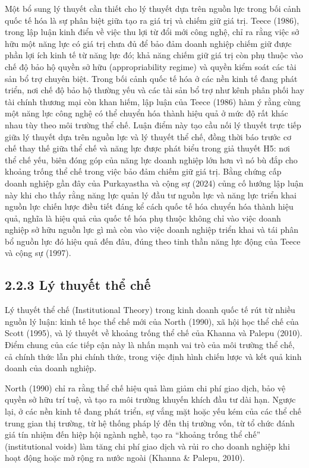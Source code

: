 \documentclass[
  a4paper,
  13pt]{extreport}
\begin{document}
Một bổ sung lý thuyết cần thiết cho lý thuyết dựa trên nguồn lực trong
bối cảnh quốc tế hóa là sự phân biệt giữa tạo ra giá trị và chiếm giữ
giá trị. Teece (1986), trong lập luận kinh điển về việc thu lợi từ đổi
mới công nghệ, chỉ ra rằng việc sở hữu một năng lực có giá trị chưa đủ
để bảo đảm doanh nghiệp chiếm giữ được phần lợi ích kinh tế từ năng lực
đó; khả năng chiếm giữ giá trị còn phụ thuộc vào chế độ bảo hộ quyền sở
hữu (appropriability regime) và quyền kiểm soát các tài sản bổ trợ
chuyên biệt. Trong bối cảnh quốc tế hóa ở các nền kinh tế đang phát
triển, nơi chế độ bảo hộ thường yếu và các tài sản bổ trợ như kênh phân
phối hay tài chính thương mại còn khan hiếm, lập luận của Teece (1986)
hàm ý rằng cùng một năng lực công nghệ có thể chuyển hóa thành hiệu quả
ở mức độ rất khác nhau tùy theo môi trường thể chế. Luận điểm này tạo
cầu nối lý thuyết trực tiếp giữa lý thuyết dựa trên nguồn lực và lý
thuyết thể chế, đồng thời báo trước cơ chế thay thế giữa thể chế và năng
lực được phát biểu trong giả thuyết H5: nơi thể chế yếu, biên đóng góp
của năng lực doanh nghiệp lớn hơn vì nó bù đắp cho khoảng trống thể chế
trong việc bảo đảm chiếm giữ giá trị. Bằng chứng cấp doanh nghiệp gần
đây của Purkayastha và cộng sự (2024) củng cố hướng lập luận này khi cho
thấy rằng năng lực quản lý đầu tư nguồn lực và năng lực triển khai nguồn
lực chiến lược điều tiết đáng kể cách quốc tế hóa chuyển hóa thành hiệu
quả, nghĩa là hiệu quả của quốc tế hóa phụ thuộc không chỉ vào việc
doanh nghiệp sở hữu nguồn lực gì mà còn vào việc doanh nghiệp triển khai
và tái phân bổ nguồn lực đó hiệu quả đến đâu, đúng theo tinh thần năng
lực động của Teece và cộng sự (1997).

\hypertarget{luxfd-thuyux1ebft-thux1ec3-chux1ebf}{%
\subsection{2.2.3 Lý thuyết thể
chế}\label{luxfd-thuyux1ebft-thux1ec3-chux1ebf}}

Lý thuyết thể chế (Institutional Theory) trong kinh doanh quốc tế rút từ
nhiều nguồn lý luận: kinh tế học thể chế mới của North (1990), xã hội
học thể chế của Scott (1995), và lý thuyết về khoảng trống thể chế của
Khanna và Palepu (2010). Điểm chung của các tiếp cận này là nhấn mạnh
vai trò của môi trường thể chế, cả chính thức lẫn phi chính thức, trong
việc định hình chiến lược và kết quả kinh doanh của doanh nghiệp.

North (1990) chỉ ra rằng thể chế hiệu quả làm giảm chi phí giao dịch,
bảo vệ quyền sở hữu trí tuệ, và tạo ra môi trường khuyến khích đầu tư
dài hạn. Ngược lại, ở các nền kinh tế đang phát triển, sự vắng mặt hoặc
yếu kém của các thể chế trung gian thị trường, từ hệ thống pháp lý đến
thị trường vốn, từ tổ chức đánh giá tín nhiệm đến hiệp hội ngành nghề,
tạo ra ``khoảng trống thể chế'' (institutional voids) làm tăng chi phí
giao dịch và rủi ro cho doanh nghiệp khi hoạt động hoặc mở rộng ra nước
ngoài (Khanna \& Palepu, 2010).
\end{document}
